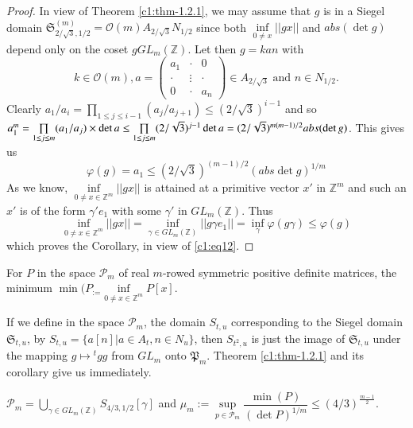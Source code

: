 \begin{proof}
In view of Theorem \ref{c1:thm-1.2.1}, we may assume that $g$ is in a
Siegel domain
$\mathfrak{S}^{(m)}_{2/\sqrt{3},1/2}=\mathcal{O}(m)A_{2/\sqrt{3}} N_{1/2}$
since both $\inf\limits_{0\neq x}||gx||$ and $abs(\det g)$ depend only
on the coset $gGL_{m}(\mathbb{Z})$. Let then $g=kan$ with
$$
k\in \mathcal{O}(m), a=
\begin{pmatrix}
a_{1} & \cdot &  0\\
\cdot & \vdots & \cdot\\
0 & \cdot & a_{n}
\end{pmatrix}
\in A_{2/\sqrt{3}}\text{ \ and \ } n\in N_{1/2}.
$$
Clearly $a_{1}/a_{i}=\prod_{1\leq j\leq i-1}(a_{j}/a_{j+1})\leq
(2/\sqrt{3})^{i-1}$ and so $a^{m}_{1}=\prod\limits_{1\leq j\leq
  m}\break(a_{1}/a_{j})\times \det a\leq \prod\limits_{1\leq j\leq
  m}(2/\sqrt{3})^{j-1}\det a=(2/\sqrt{3})^{m(m-1)/2}abs(\det g)$. This
gives us 
\begin{equation*}
\varphi(g)=a_{1}\leq (2/\sqrt{3})^{(m-1)/2}(abs\det
g)^{1/m}\tag{12}\label{c1:eq12} 
\end{equation*}
As we know, $\inf\limits_{0\neq x\in \mathbb{Z}^{m}}||gx||$ is
attained at a primitive vector $x'$ in $\mathbb{Z}^{m}$ and such an
$x'$ is of the form $\gamma'e_{1}$ with some $\gamma'$ in
$GL_{m}(\mathbb{Z})$. Thus\pageoriginale 
$$\inf\limits_{0\neq x\in
  \mathbb{Z}^{m}}||gx||=\inf\limits_{\gamma\in
  GL_{m}(\mathbb{Z})}||g\gamma
e_{1}||=\inf\limits_{\gamma}\varphi(g\gamma)\leq \varphi(g)$$ which
proves the Corollary, in view of \eqref{c1:eq12}.
\end{proof}

\begin{defi*}
For $P$ in the space $\mathscr{P}_{m}$ of real $m$-rowed symmetric
positive definite matrices, the minimum $\min(P_:=\inf\limits_{0\neq
  x\in \mathbb{Z}^{m}}P[x]$.
\end{defi*}

If we define in the space $\mathscr{P}_{m}$, the domain $S_{t,u}$
corresponding to the Siegel domain $\mathfrak{S}_{t,u}$, by
$S_{t,u}=\{a[n]|a\in A_{t}, n\in N_{u}\}$, then $S_{t^{2},u}$ is just
the image of $\mathfrak{S}_{t,u}$ under the mapping $g\mapsto
{}^{t}gg$ from $GL_{m}$ onto $\mathfrak{P}_{m}$. Theorem
\ref{c1:thm-1.2.1} and its corollary give us immediately.

\setcounter{subtheorem}{4}
\begin{subtheorem}\label{c1:thm-1.2.5}
$\mathscr{P}_{m}=\bigcup\limits_{\gamma\in
    GL_{m}(\mathbb{Z})}S_{4/3,1/2}[\gamma]$ and
  $\mu_{m}:=\sup\limits_{p\in\mathscr{P}_{m}}\dfrac{\min(P)}{(\det
    P)^{1/m}}\leq (4/3)^{\frac{m-1}{2}}$. 
\end{subtheorem}

